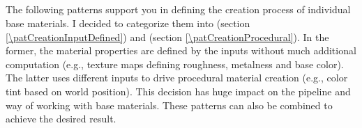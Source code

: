 
\subsection{\patCatCreation}\label{\patCatCreation}

The following patterns support you in defining the creation process of individual base materials. I decided to categorize them into \emph{\patCreationInputDefined} (section \ref{\patCreationInputDefined}) and \emph{\patCreationProcedural} (section \ref{\patCreationProcedural}). In the former, the material properties are defined by the inputs without much additional computation (e.g., texture maps defining roughness, metalness and base color). The latter uses different inputs to drive procedural material creation (e.g., color tint based on world position). This decision has huge impact on the pipeline and way of working with base materials. These patterns can also be combined to achieve the desired result.  

